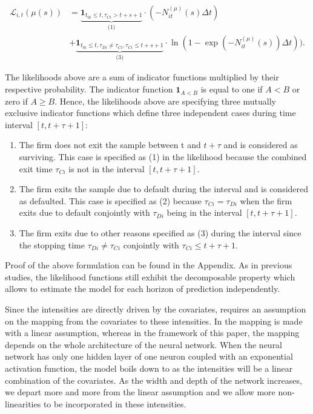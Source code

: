 \begin{align} \label{small_lik_h}
\mathcal{L}_{i,t}(\mu(s)) &= \underbrace{\textbf{1}_{t_{0i} \leq t,\tau_{Ci} > t + s +1}}_\textrm{(1)} \cdot (-N_{it}^{(\mu)}(s) \Delta t)\\ \nonumber
&+ \underbrace{\textbf{1}_{t_{0i} \leq t, \tau_{Di} \neq \tau_{Ci}, \tau_{Ci} \leq t+s+1}}_\textrm{(3)} \cdot \ln(1-\exp(-N_{it}^{(\mu)}(s))\Delta t)).
\end{align}

The likelihoods above are a sum of indicator functions multiplied by their respective probability. The indicator function $\textbf{1}_{A<B}$ is equal to one if $A<B$ or zero if $A \geq B$. Hence, the likelihoods above are specifying three mutually exclusive indicator functions which define three independent cases during time interval $[t,t+\tau+1]$:
\begin{enumerate}
\item The firm does not exit the sample between t and $t+\tau$ and is considered as surviving. This case is specified as (1) in the likelihood because the combined exit time $\tau_{Ci}$ is not in the interval $[t,t+\tau+1]$.
\item The firm exits the sample due to default during the interval and is considered as defaulted. This case is specified as (2) because $\tau_{Ci}=\tau_{Di}$ when the firm exits due to default conjointly with $\tau_{Di}$ being in the interval $[t,t+\tau+1]$.
\item The firm exits due to other reasons specified as (3) during the interval since the stopping time $\tau_{Di} \neq \tau_{Ci}$ conjointly with $\tau_{Ci} \leq t+\tau+1$.
\end{enumerate}

Proof of the above formulation can be found in the Appendix. As in previous studies, the likelihood functions still exhibit the decomposable property which allows to estimate the model for each horizon of prediction independently.

Since the intensities are directly driven by the covariates, \citet{Duan2012} requires an assumption on the mapping from the covariates to these intensities. In \citet{Duan2012} the mapping is made with a linear assumption, whereas in the framework of this paper, the mapping depends on the whole architecture of the neural network. When the neural network has only one hidden layer of one neuron coupled with an exponential activation function, the model boils down to \citet{Duan2012} as the intensities will be a linear combination of the covariates. As the width and depth of the network increases, we depart more and more from the linear assumption and we allow more non-linearities to be incorporated in these intensities. \\ 


